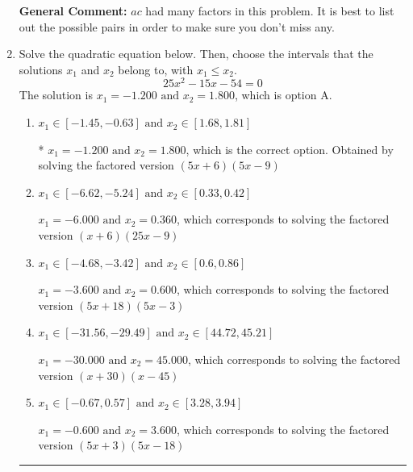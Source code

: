 \documentclass{extbook}[14pt]
\newcommand{\litem}[1]{\item #1

\rule{\textwidth}{0.4pt}}
\begin{document}
\begin{enumerate}
{\textbf{General Comment:} $ac$ had many factors in this problem. It is best to list out the possible pairs in order to make sure you don't miss any.
}
\litem{
Solve the quadratic equation below. Then, choose the intervals that the solutions $x_1$ and $x_2$ belong to, with $x_1 \leq x_2$.
\[ 25x^{2} -15 x -54 = 0 \]The solution is \( x_1 = -1.200 \text{ and } x_2 = 1.800 \), which is option A.\begin{enumerate}[label=\Alph*.]
\item \( x_1 \in [-1.45, -0.63] \text{ and } x_2 \in [1.68, 1.81] \)

* $x_1 = -1.200 \text{ and } x_2 = 1.800$, which is the correct option. Obtained by solving the factored version $(5x + 6)(5x -9)$
\item \( x_1 \in [-6.62, -5.24] \text{ and } x_2 \in [0.33, 0.42] \)

$x_1 = -6.000 \text{ and } x_2 = 0.360$, which corresponds to solving the factored version $(x + 6)(25x -9)$
\item \( x_1 \in [-4.68, -3.42] \text{ and } x_2 \in [0.6, 0.86] \)

$x_1 = -3.600 \text{ and } x_2 = 0.600$, which corresponds to solving the factored version $(5x + 18)(5x -3)$
\item \( x_1 \in [-31.56, -29.49] \text{ and } x_2 \in [44.72, 45.21] \)

$x_1 = -30.000 \text{ and } x_2 = 45.000$, which corresponds to solving the factored version $(x + 30)(x -45)$
\item \( x_1 \in [-0.67, 0.57] \text{ and } x_2 \in [3.28, 3.94] \)

$x_1 = -0.600 \text{ and } x_2 = 3.600$, which corresponds to solving the factored version $(5x + 3)(5x -18)$
\end{enumerate}

}
\end{enumerate}
\end{document}
